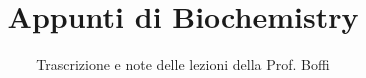 \documentclass[a4paper,12pt]{article}
\title{Appunti di Biochemistry}
\author{Trascrizione e note delle lezioni della Prof. Boffi}
\date{}
\begin{document}
\maketitle
\projectintro
\tableofcontents
\newpage

\end{document}
